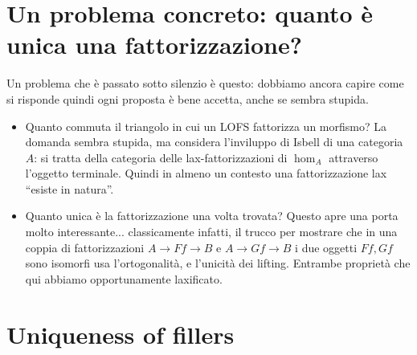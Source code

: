 \documentclass{amsart}
\begin{document}
\section{Un problema concreto: quanto è unica una fattorizzazione?}
Un problema che è passato sotto silenzio è questo: dobbiamo ancora capire come si risponde quindi ogni proposta è bene accetta, anche se sembra stupida.
\begin{itemize}
  \item Quanto commuta il triangolo in cui un LOFS fattorizza un morfismo? La domanda sembra stupida, ma considera l'inviluppo di Isbell di una categoria $A$: si tratta della categoria delle lax-fattorizzazioni di $\hom_A$ attraverso l'oggetto terminale. Quindi in almeno un contesto una fattorizzazione lax ``esiste in natura''.
  \item Quanto unica è la fattorizzazione una volta trovata? Questo apre una porta molto interessante... classicamente infatti, il trucco per mostrare che in una coppia di fattorizzazioni $A \to Ff \to B$ e $A \to Gf\to B$ i due oggetti $Ff,Gf$ sono isomorfi usa l'ortogonalità, e l'unicità dei lifting. Entrambe proprietà che qui abbiamo opportunamente laxificato.
\end{itemize}
\section{Uniqueness of fillers}
\end{document}
